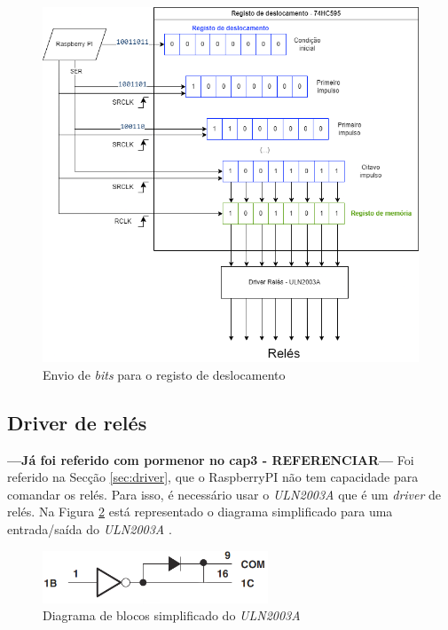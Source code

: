 
\begin{figure}[hbtp]
	\centering
	\includegraphics[width=1\textwidth]{figures/registo deslocamente.drawio.png}
	\caption{Envio de \textit{bits} para o registo de deslocamento}
	\label{fig:esquematico74hc595}
\end{figure}

\subsection{Driver de relés}
\label{sec:driverreles}

\textbf{---Já foi referido com pormenor no cap3 - REFERENCIAR---}
Foi referido na Secção \ref{sec:driver}, que o \gls{RaspberryPI} não tem capacidade para comandar os relés. Para isso, é necessário usar o \textit{ULN2003A} que é um \textit{driver} de relés. Na Figura \ref{fig:diagramablocos2003} está representado o diagrama simplificado para uma entrada/saída do \textit{ULN2003A} \cite{ULN2003}.

\begin{figure}[hbtp]
	\centering
	\includegraphics[width=0.6\textwidth]{figures/uln2003_diagramablocos.png}
	\caption{Diagrama de blocos simplificado do \textit{ULN2003A}}
	\label{fig:diagramablocos2003}
\end{figure}

